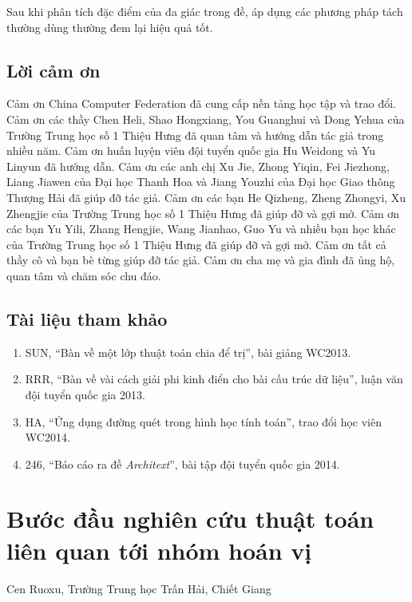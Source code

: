 \documentclass[11pt]{article}
\begin{document}
Sau khi phân tích đặc điểm của đa giác trong đề, áp dụng các phương pháp tách
thường dùng thường đem lại hiệu quả tốt.

\subsection{Lời cảm ơn}

Cảm ơn China Computer Federation đã cung cấp nền tảng học tập và trao đổi. Cảm
ơn các thầy Chen Heli, Shao Hongxiang, You Guanghui và Dong Yehua của Trường
Trung học số 1 Thiệu Hưng đã quan tâm và hướng dẫn tác giả trong nhiều năm.
Cảm ơn huấn luyện viên đội tuyển quốc gia Hu Weidong và Yu Linyun đã hướng dẫn.
Cảm ơn các anh chị Xu Jie, Zhong Yiqin, Fei Jiezhong, Liang Jiawen của Đại học
Thanh Hoa và Jiang Youzhi của Đại học Giao thông Thượng Hải đã giúp đỡ tác giả.
Cảm ơn các bạn He Qizheng, Zheng Zhongyi, Xu Zhengjie của Trường Trung học số 1
Thiệu Hưng đã giúp đỡ và gợi mở. Cảm ơn các bạn Yu Yili, Zhang Hengjie, Wang
Jianhao, Guo Yu và nhiều bạn học khác của Trường Trung học số 1 Thiệu Hưng đã
giúp đỡ và gợi mở. Cảm ơn tất cả thầy cô và bạn bè từng giúp đỡ tác giả. Cảm ơn
cha mẹ và gia đình đã ủng hộ, quan tâm và chăm sóc chu đáo.

\subsection*{Tài liệu tham khảo}

\begin{enumerate}
  \item SUN, ``Bàn về một lớp thuật toán chia để trị'', bài giảng WC2013.
  \item RRR, ``Bàn về vài cách giải phi kinh điển cho bài cấu trúc dữ liệu'',
  luận văn đội tuyển quốc gia 2013.
  \item HA, ``Ứng dụng đường quét trong hình học tính toán'', trao đổi học viên
  WC2014.
  \item 246, ``Báo cáo ra đề \emph{Architext}'', bài tập đội tuyển quốc gia
  2014.
\end{enumerate}

\section{Bước đầu nghiên cứu thuật toán liên quan tới nhóm hoán vị}

\begin{center}
Cen Ruoxu, Trường Trung học Trấn Hải, Chiết Giang
\end{center}
\end{document}
